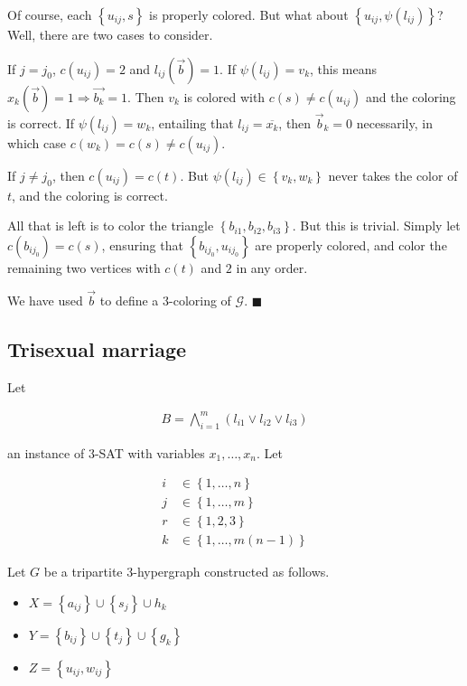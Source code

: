 \documentclass[a4paper]{article}
\begin{document}
Of course, each $\left\{ u_{ij}, s \right\} $ is properly colored. But what about 
$\left\{ u_{ij}, \psi(l_{ij}) \right\} $? Well, there are two cases to consider. 

If $j = j_0$, $c(u_{ij}) = 2$ and $l_{ij}(\overrightarrow{b}) = 1$. If
$\psi(l_{ij}) = v_k$, this means $x_{k}(\overrightarrow{b}) = 1 \Rightarrow
\overrightarrow{b_k} = 1$. Then $v_k$ is colored with $c(s) \neq c(u_{ij})$ and the coloring 
is correct. If $\psi(l_{ij}) = w_k$, entailing that $l_{ij} = \overline{x_k}$, then 
$\overrightarrow{b}_k = 0$ necessarily, in which case $c(w_k) = c(s) \neq c(u_{ij})$.

If $j \neq j_0$, then $c(u_{ij}) = c(t)$. But $\psi(l_{ij}) \in \left\{ v_k, w_k \right\} $ never
takes the color of $t$, and the coloring is correct.

All that is left is to color the triangle $\left\{ b_{i1}, b_{i2}, b_{i 3} \right\} $.
But this is trivial. Simply let $c(b_{i j_0}) = c(s)$, ensuring 
that $\left\{ b_{i j_0}, u_{i j_0} \right\} $ are properly colored,
and color the remaining two vertices with $c(t)$ and $2$ in 
any order.

We have used $\overrightarrow{b}$ to define a 3-coloring of $\mathcal{G}$. $\blacksquare$

\pagebreak
\subsection{Trisexual marriage}

Let 

\begin{align*}
    B = \bigwedge_{i=1}^{m} \left( l_{i 1} \lor  l_{i 2} \lor  l_{i 3} \right) 
\end{align*}

an instance of $3$-SAT with variables $x_1, \ldots, x_n$. Let 

\begin{align*}
    i &\in \left\{ 1,\ldots, n \right\}  \\
    j &\in \left\{ 1,\ldots, m \right\}  \\
    r &\in \left\{ 1, 2, 3 \right\}  \\
    k &\in \left\{ 1, \ldots, m(n-1) \right\} 
\end{align*}

Let $G$ be a tripartite $3$-hypergraph constructed as follows. 

\begin{itemize}
    \item $X = \left\{ a_{ij} \right\} \cup \left\{ s_j \right\} \cup h_k $
    \item $Y = \left\{ b_{ij} \right\}  \cup \left\{ t_j \right\}  \cup \left\{ g_k \right\} $
    \item $Z = \left\{ u_{ij}, w_{ij} \right\} $
\end{itemize}
\end{document}
